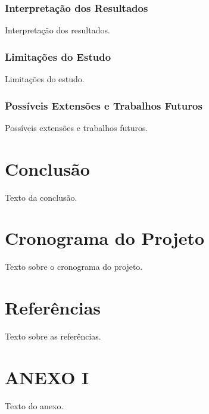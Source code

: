 \documentclass{article}
\begin{document}
\subsubsection{Interpretação dos Resultados}
Interpretação dos resultados.
\label{subsubsec:interpretacao-resultados}

\subsubsection{Limitações do Estudo}
Limitações do estudo.
\label{subsubsec:limitacoes-estudo}

\subsubsection{Possíveis Extensões e Trabalhos Futuros}
Possíveis extensões e trabalhos futuros.
\label{subsubsec:extensoes-trabalhos-futuros}

\section{Conclusão}
Texto da conclusão.
\label{sec:conclusao}

\section{Cronograma do Projeto}
Texto sobre o cronograma do projeto.
\label{sec:cronograma}

\section{Referências}
Texto sobre as referências.
\label{sec:referencias}

\section*{ANEXO I}
Texto do anexo.
\label{sec:anexo}
\end{document}
